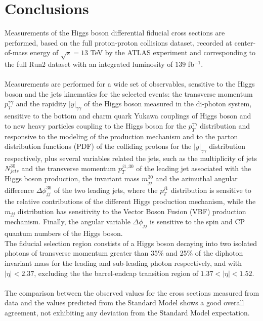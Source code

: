 \chapter*{Conclusions}
Measurements of the Higgs boson differential fiducial cross sections are performed, based on the full proton-proton collisions dataset, recorded at center-of-mass energy of $\sqrt{s} = 13$ TeV by the ATLAS experiment and corresponding to the full Run2 dataset with an integrated luminosity of $139$ fb$^{-1}$.
\\\\
Measurements are performed for a wide set of observables, sensitive to the Higgs boson and the jets kinematics for the selected events: the transverse momentum $p_T^{\gamma\gamma}$ and the rapidity $|y|_{\gamma\gamma}$ of the Higgs boson measured in the di-photon system, sensitive to the bottom and charm quark Yukawa couplings of Higgs boson \cite{Bishara_2017} and to new heavy particles coupling to the Higgs boson for the $p_T^{\gamma\gamma}$ distribution and responsive to the modeling of the production mechanism and to the parton distribution functions (PDF) of the colliding protons for the $|y|_{\gamma\gamma}$ distribution respectively, plus several variables related the jets, such as the multiplicity of jets $N_{jets}^{30}$ and the transverse momentum $p_T^{j1, 30}$ of the leading jet associated with the Higgs boson production, the invariant mass $m_{jj}^{30}$ and the azimuthal angular difference $\Delta\phi_{jj}^{30}$ of the two leading jets, where the $p_T^{j1}$ distribution is sensitive  to the relative contributions of the different Higgs production mechanism, while the $m_{jj}$ distribution has sensitivity to the Vector Boson Fusion (VBF) production mechanism. Finally, the angular variable $\Delta \phi_{jj}$ is sensitive to the spin and CP quantum numbers of the Higgs boson.
\\
The fiducial selection region constists of a Higgs boson decaying into two isolated photons of transverse momentum greater than 35\% and 25\% of the diphoton invariant mass for the leading and sub-leading photon respectively, and with $|\eta| < 2.37$, excluding the the barrel-endcap transition region of $1.37 < |\eta| < 1.52$.
\\\\
The comparison between the observed values for the cross sections measured from data and the values predicted from the Standard Model shows a good overall agreement, not exhibiting any deviation from the Standard Model expectation.
\\

